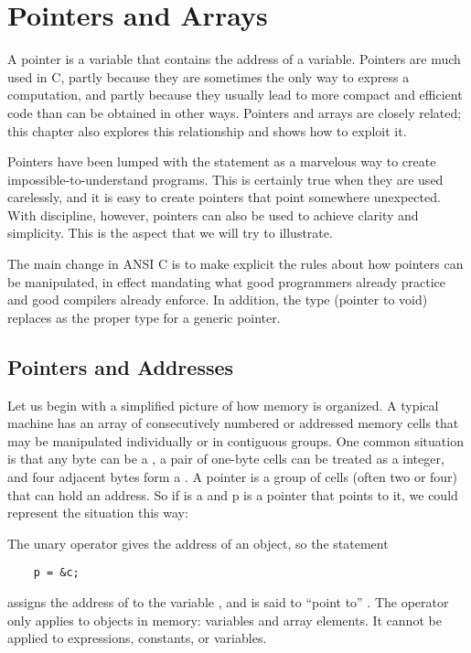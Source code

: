 
\chapter{Pointers and Arrays}


A pointer is a variable that contains the address of a variable.
Pointers are much used in C, partly because they are sometimes the only way to express a computation, and partly because they usually lead to more compact and efficient code than can be obtained in other ways.
Pointers and arrays are closely related; this chapter also explores this relationship and shows how to exploit it.

Pointers have been lumped with the  statement as a marvelous way to create impossible-to-understand programs.
This is certainly true when they are used carelessly, and it is easy to create pointers that point somewhere unexpected.
With discipline, however, pointers can also be used to achieve clarity and simplicity. This is the aspect that we will try to illustrate.

The main change in ANSI C is to make explicit the rules about how pointers can be manipulated, in effect mandating what good programmers already practice and good compilers already enforce.
In addition, the type  (pointer to void) replaces  as the proper type for a generic pointer.



\section{Pointers and Addresses}


Let us begin with a simplified picture of how memory is organized.
A typical machine has an array of consecutively numbered or addressed memory cells that may be manipulated individually or in contiguous groups.
One common situation is that any byte can be a , a pair of one-byte cells can be treated as a  integer, and four adjacent bytes form a .
A pointer is a group of cells (often two or four) that can hold an address.
So if  is a  and p is a pointer that points to it, we could represent the situation this way:


The unary operator \code{\&} gives the address of an object, so the statement
\begin{lstlisting}
	p = &c;
\end{lstlisting}
assigns the address of  to the variable , and  is said to ``point to'' .
The \code{\&} operator only applies to objects in memory: variables and array elements. It cannot be applied to expressions, constants, or  variables.

